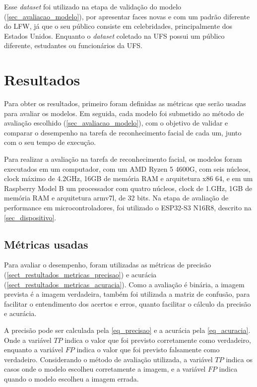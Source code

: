 Esse \textit{dataset} foi utilizado na etapa de validação do modelo (\ref{sec_avaliacao_modelo}), por apresentar faces
novas e com um padrão diferente do LFW, já que o seu público consiste em celebridades, principalmente dos Estados
Unidos. Enquanto o \textit{dataset} coletado na UFS possui um público diferente, estudantes ou funcionários da UFS.

\section{Resultados}\label{sec_resultados}
Para obter os resultados, primeiro foram definidas as métricas que serão usadas para avaliar os modelos. Em seguida,
cada modelo foi submetido ao método de avaliação escolhido (\autoref{sec_avaliacao_modelo}), com o objetivo de
validar e comparar o desempenho na tarefa de reconhecimento facial de cada um, junto com o seu tempo de execução.

Para realizar a avaliação na tarefa de reconhecimento facial, os modelos foram executados em um computador, com um
AMD Ryzen 5 4600G, com seis núcleos, clock máximo de 4.2GHz, 16GB de memória RAM e arquitetura x86 64,
e em um Raspberry Model B um processador com quatro núcleos, clock de 1.GHz, 1GB de memória RAM e arquitetura armv7l,
de 32 bits.
Na etapa de avaliação de performance em microcontroladores, foi utilizado
o ESP32-S3 N16R8, descrito na \autoref{sec_dispositivo}.

\subsection{Métricas usadas}\label{sect_restultados_metricas}
Para avaliar o desempenho, foram utilizadas as métricas de precisão (\ref{sect_restultados_metricas_precisao})
e acurácia (\ref{sect_restultados_metricas_acuracia}). Como a avaliação é binária, a imagem prevista é a imagem
verdadeira, também foi utilizada a matriz de confusão, para facilitar o entendimento dos acertos e erros, quanto
facilitar o cálculo da precisão e acurácia.

\label{sect_restultados_metricas_precisao}
A precisão pode ser calculada pela \autoref{eq_precisao} e a acurácia pela \autoref{eq_acuracia}.
Onde a variável $TP$ indica o valor que foi previsto corretamente como verdadeiro, enquanto a variável $FP$ indica o
valor que foi previsto falsamente como verdadeiro.
Considerando o método de avaliação utilizada, a variável $TP$ indica os casos onde o modelo escolheu corretamente a
imagem, e a variável $FP$  indica quando o modelo escolheu a imagem errada.

